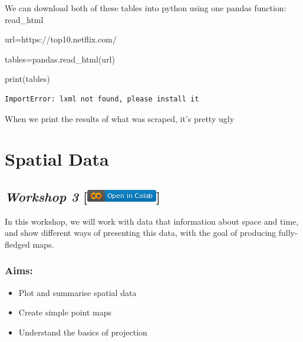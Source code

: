 \documentclass[
  letterpaper,
  DIV=11,
  numbers=noendperiod]{scrreprt}
\newenvironment{Shaded}{\begin{snugshade}}{\end{snugshade}}
\newcommand{\BuiltInTok}[1]{\textcolor[rgb]{0.00,0.23,0.31}{#1}}
\newcommand{\NormalTok}[1]{\textcolor[rgb]{0.00,0.23,0.31}{#1}}
\newcommand{\OperatorTok}[1]{\textcolor[rgb]{0.37,0.37,0.37}{#1}}
\newcommand{\StringTok}[1]{\textcolor[rgb]{0.13,0.47,0.30}{#1}}
\providecommand{\tightlist}{%
  \setlength{\itemsep}{0pt}\setlength{\parskip}{0pt}}\usepackage{longtable,booktabs,array}
\begin{document}
We can download both of these tables into python using one pandas
function: read\_html

\begin{Shaded}
\begin{Highlighting}[]
\NormalTok{url}\OperatorTok{=}\StringTok{\textquotesingle{}https://top10.netflix.com/\textquotesingle{}}

\NormalTok{tables}\OperatorTok{=}\NormalTok{pandas.read\_html(url)}

\BuiltInTok{print}\NormalTok{(tables)}
\end{Highlighting}
\end{Shaded}

\begin{verbatim}
ImportError: lxml not found, please install it
\end{verbatim}

When we print the results of what was scraped, it's pretty ugly


\hypertarget{spatial-data}{%
\chapter{Spatial Data}\label{spatial-data}}

\hypertarget{workshop-3-open-in-colab}{%
\section[\emph{Workshop 3} {[}{]}]{\texorpdfstring{\emph{Workshop 3}
{[}\protect\includegraphics{notebooks/../colab-badge.png}{]}}{Workshop 3 {[}Open In Colab{]}}}\label{workshop-3-open-in-colab}}

In this workshop, we will work with data that information about space
and time, and show different ways of presenting this data, with the goal
of producing fully-fledged maps.

\hypertarget{aims-1}{%
\subsection{Aims:}\label{aims-1}}

\begin{itemize}
\tightlist
\item
  Plot and summarise spatial data
\item
  Create simple point maps
\item
  Understand the basics of projection
\end{itemize}
\end{document}
